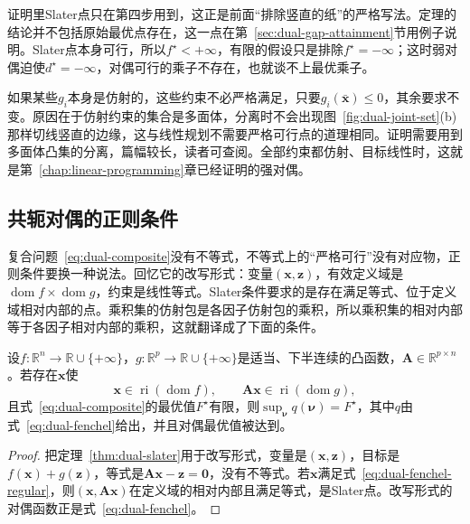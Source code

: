 证明里Slater点只在第四步用到，这正是前面“排除竖直的纸”的严格写法。定理的结论并不包括原始最优点存在，这一点在第~\ref{sec:dual-gap-attainment}节用例子说明。Slater点本身可行，所以$f^\star<+\infty$，有限的假设只是排除$f^\star=-\infty$；这时弱对偶迫使$d^\star=-\infty$，对偶可行的乘子不存在，也就谈不上最优乘子。

如果某些$g_i$本身是仿射的，这些约束不必严格满足，只要$g_i(\bar{\bm{x}})\leq0$，其余要求不变。原因在于仿射约束的集合是多面体，分离时不会出现图~\ref{fig:dual-joint-set}(b)那样切线竖直的边缘，这与线性规划不需要严格可行点的道理相同。证明需要用到多面体凸集的分离，篇幅较长，读者可查阅。全部约束都仿射、目标线性时，这就是第~\ref{chap:linear-programming}章已经证明的强对偶。

\subsection{共轭对偶的正则条件}
\label{sec:dual-regularity}

复合问题~\eqref{eq:dual-composite}没有不等式，不等式上的“严格可行”没有对应物，正则条件要换一种说法。回忆它的改写形式：变量$(\bm{x},\bm{z})$，有效定义域是$\operatorname{dom}f\times\operatorname{dom}g$，约束是线性等式。Slater条件要求的是存在满足等式、位于定义域相对内部的点。乘积集的仿射包是各因子仿射包的乘积，所以乘积集的相对内部等于各因子相对内部的乘积，这就翻译成了下面的条件。

\begin{theorem}[Fenchel对偶的强对偶]
 \label{thm:dual-fenchel-strong}
 设$f:\mathbb{R}^n\to\mathbb{R}\cup\{+\infty\}$，$g:\mathbb{R}^p\to\mathbb{R}\cup\{+\infty\}$是适当、下半连续的凸函数，$\bm{A}\in\mathbb{R}^{p\times n}$。若存在$\bm{x}$使
 \begin{equation}
  \bm{x}\in\operatorname{ri}(\operatorname{dom}f),\qquad\bm{A}\bm{x}\in\operatorname{ri}(\operatorname{dom}g),
  \label{eq:dual-fenchel-regular}
 \end{equation}
 且式~\eqref{eq:dual-composite}的最优值$F^\star$有限，则$\sup_{\bm{\nu}}q(\bm{\nu})=F^\star$，其中$q$由式~\eqref{eq:dual-fenchel}给出，并且对偶最优值被达到。
\end{theorem}

\begin{proof}
 把定理~\ref{thm:dual-slater}用于改写形式，变量是$(\bm{x},\bm{z})$，目标是$f(\bm{x})+g(\bm{z})$，等式是$\bm{A}\bm{x}-\bm{z}=\bm{0}$，没有不等式。若$\bm{x}$满足式~\eqref{eq:dual-fenchel-regular}，则$(\bm{x},\bm{A}\bm{x})$在定义域的相对内部且满足等式，是Slater点。改写形式的对偶函数正是式~\eqref{eq:dual-fenchel}。
\end{proof}

